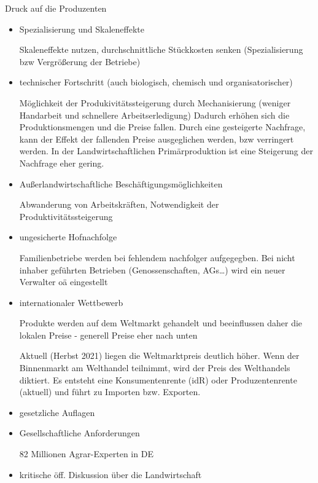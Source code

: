 \documentclass[11pt]{article}
\begin{document}
Druck auf die Produzenten
\begin{itemize}
	\item{Spezialisierung und Skaleneffekte}

		Skaleneffekte nutzen, durchschnittliche Stückkosten senken (Spezialisierung bzw Vergrößerung der Betriebe)
	\item{technischer Fortschritt (auch biologisch, chemisch und organisatorischer)}

		Möglichkeit der Produkivitätssteigerung durch Mechanisierung (weniger Handarbeit und schnellere Arbeitserledigung)
		Dadurch erhöhen sich die Produktionsmengen und die Preise fallen. Durch eine gesteigerte Nachfrage, kann der Effekt der fallenden Preise ausgeglichen werden, bzw verringert werden.
		In der Landwirtschaftlichen Primärproduktion ist eine Steigerung der Nachfrage eher gering.
	\item{Außerlandwirtschaftliche Beschäftigungsmöglichkeiten}

		Abwanderung von Arbeitskräften, Notwendigkeit der Produktivitätssteigerung
	\item{ungesicherte Hofnachfolge}

		Familienbetriebe werden bei fehlendem nachfolger aufgegegben. Bei nicht inhaber geführten Betrieben (Genossenschaften, AGs\ldots) wird ein neuer Verwalter oä eingestellt
	\item{internationaler Wettbewerb}

		Produkte werden auf dem Weltmarkt gehandelt und beeinflussen daher die lokalen Preise - generell Preise eher nach unten

		Aktuell (Herbst 2021) liegen die Weltmarktpreis deutlich höher.
		Wenn der Binnenmarkt am Welthandel teilnimmt, wird der Preis des Welthandels diktiert.
		Es entsteht eine Konsumentenrente (idR) oder Produzentenrente (aktuell) und führt zu Importen bzw. Exporten.

	\item{gesetzliche Auflagen}

	\item{Gesellschaftliche Anforderungen}

		82 Millionen Agrar-Experten in DE
	\item{kritische öff. Diskussion über die Landwirtschaft}
\end{itemize}
\end{document}
